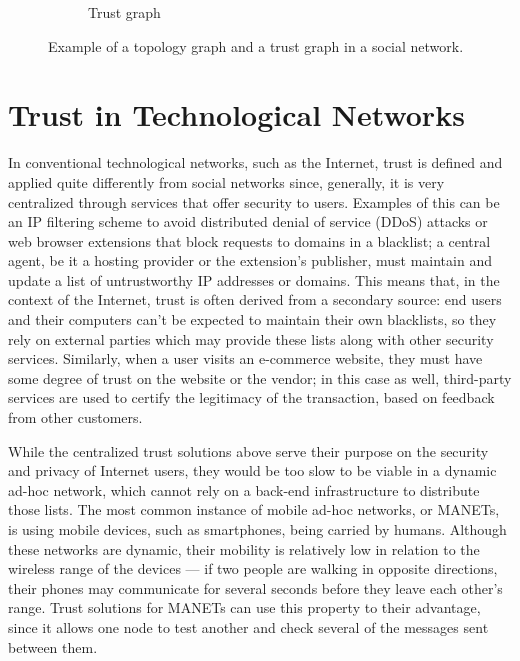 \begin{figure}
\begin{subfigure}{0.5\textwidth}
\caption{Trust graph} \label{fig:2_1b}
\end{subfigure}
\caption{Example of a topology graph and a trust graph in a social network.} \label{fig:social_network}
\end{figure}



\section{Trust in Technological Networks}
\label{section:trusttechnological}
In conventional technological networks, such as the Internet, trust is defined and applied quite differently from social networks since, generally, it is very centralized through services that offer security to users.
Examples of this can be an IP filtering scheme to avoid distributed denial of service (DDoS) attacks or web browser extensions that block requests to domains in a blacklist; a central agent, be it a hosting provider or the extension's publisher, must maintain and update a list of untrustworthy IP addresses or domains.
This means that, in the context of the Internet, trust is often derived from a secondary source: end users and their computers can't be expected to maintain their own blacklists, so they rely on external parties which may provide these lists along with other security services.
Similarly, when a user visits an e-commerce website, they must have some degree of trust on the website or the vendor; in this case as well, third-party services are used to certify the legitimacy of the transaction, based on feedback from other customers.

While the centralized trust solutions above serve their purpose on the security and privacy of Internet users, they would be too slow to be viable in a dynamic ad-hoc network, which cannot rely on a back-end infrastructure to distribute those lists.
The most common instance of mobile ad-hoc networks, or MANETs, is using mobile devices, such as smartphones, being carried by humans.
Although these networks are dynamic, their mobility is relatively low in relation to the wireless range of the devices — if two people are walking in opposite directions, their phones may communicate for several seconds before they leave each other's range.
Trust solutions for MANETs can use this property to their advantage, since it allows one node to test another and check several of the messages sent between them.

